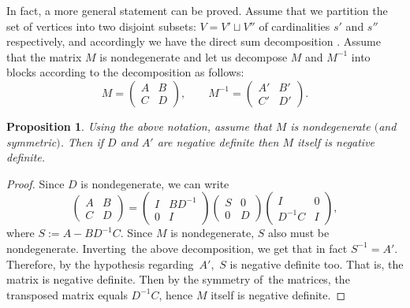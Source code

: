 \documentclass[pdftex]{sigma}
\newtheorem{Proposition}[Theorem]{Proposition}
 { \theoremstyle{definition}
\newtheorem{Definition}[Theorem]{Definition}
\newtheorem{Note}[Theorem]{Note}
\newtheorem{Example}[Theorem]{Example}
\newtheorem{Remark}[Theorem]{Remark}
\newtheorem{Question}[theorem]{Question}
}
\begin{document}
In fact, a more general statement can be proved. Assume that we partition the set of vertices into two disjoint subsets: $V=V'\sqcup V''$ of cardinalities $s'$ and $s''$ respectively, and accordingly we have the direct sum decomposition .
Assume that the matrix $M$ is nondegenerate and let us decompose $M$ and $M^{-1}$ into blocks according to the decomposition  as follows:
\[
M=\begin{pmatrix} A& B\\ C& D\end{pmatrix}, \qquad
M^{-1}=\begin{pmatrix} A'& B'\\ C'& D'\end{pmatrix}.
\]
\begin{Proposition}\label{prop:app2}
 Using the above notation, assume that $M$ is nondegenerate $($and symmetric$)$. Then if
 $D$ and $A'$ are negative definite then $M$ itself is negative definite.
\end{Proposition}

\begin{proof}
 Since $D$ is nondegenerate, we can write
\[
\begin{pmatrix} A& B\\ C& D\end{pmatrix}=
\begin{pmatrix} I& BD^{-1}\\ 0& I\end{pmatrix}
\begin{pmatrix} S& 0\\ 0& D\end{pmatrix}
\begin{pmatrix} I& 0\\ D^{-1}C& I\end{pmatrix},
\]
where $S:= A-BD^{-1}C$. Since $M$ is nondegenerate, $S$ also must be nondegenerate.
Inverting~the above decomposition, we get that in fact $S^{-1}=A'$. Therefore, by the hypothesis regarding~$A'$,~$S$ is negative definite too. That is, the matrix
 is negative definite.
Then by the symmetry of~the matrices, the transposed matrix  equals
$D^{-1}C$, hence $M$ itself is negative definite.
\end{proof}
\end{document}

